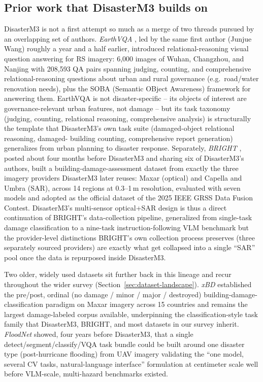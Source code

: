 \subsection{Prior work that DisasterM3 builds on}
\label{sec:related-prior}

DisasterM3 is not a first attempt so much as a merge of two threads pursued
by an overlapping set of authors. \emph{EarthVQA} ,
led by the same first author (Junjue Wang) roughly a year and a half earlier,
introduced relational-reasoning visual question answering for RS imagery:
6,000 images of Wuhan, Changzhou, and Nanjing with 208,593 QA pairs spanning
judging, counting, and comprehensive relational-reasoning questions about
urban and rural governance (e.g.\ road/water renovation needs), plus the SOBA
(Semantic OBject Awareness) framework for answering them. EarthVQA is not
disaster-specific -- its objects of interest are governance-relevant urban
features, not damage -- but its task taxonomy (judging, counting, relational
reasoning, comprehensive analysis) is structurally the template that
DisasterM3's own task suite (damaged-object relational reasoning, damaged-
building counting, comprehensive report generation) generalizes from urban
planning to disaster response. Separately, \emph{BRIGHT}
, posted about four months before DisasterM3 and sharing
six of DisasterM3's authors,
built a building-damage-assessment dataset from exactly the three imagery
providers DisasterM3 later reuses: Maxar (optical) and Capella and Umbra
(SAR), across 14 regions at 0.3--1\,m resolution, evaluated with seven models
and adopted as the official dataset of the 2025 IEEE GRSS Data Fusion
Contest. DisasterM3's multi-sensor optical+SAR design is thus a direct
continuation of BRIGHT's data-collection pipeline, generalized from
single-task damage classification to a nine-task instruction-following VLM
benchmark but the provider-level distinctions BRIGHT's own collection
process preserves (three separately sourced providers) are exactly what get
collapsed into a single ``SAR'' pool once the data is repurposed inside
DisasterM3.

Two older, widely used datasets sit further back in this lineage and recur
throughout the wider survey (Section~\ref{sec:dataset-landscape}). \emph{xBD}
\cite{gupta2019xbd} established the pre/post, ordinal (no damage / minor /
major / destroyed) building-damage-classification paradigm on Maxar imagery
across 15 countries and remains the largest damage-labeled corpus available,
underpinning the classification-style task family that DisasterM3, BRIGHT,
and most datasets in our survey inherit. \emph{FloodNet}
\cite{rahnemoonfar2021floodnet} showed, four years before DisasterM3, that a
single detect/segment/classify/VQA task bundle could be built around one
disaster type (post-hurricane flooding) from UAV imagery validating the
``one model, several CV tasks, natural-language interface'' formulation at
centimeter scale well before VLM-scale, multi-hazard benchmarks existed.

